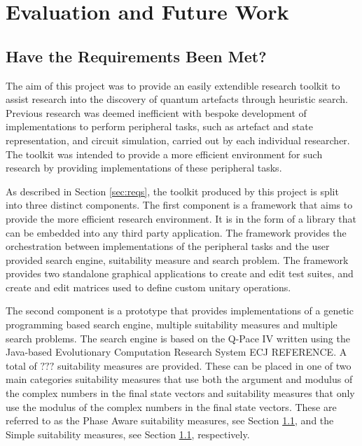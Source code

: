 \chapter{Evaluation and Future Work}

\section{Have the Requirements Been Met?}




The aim of this project was to provide an easily extendible research toolkit to assist research into the discovery of quantum artefacts through heuristic search.
Previous research was deemed inefficient with bespoke development of implementations to perform peripheral tasks, such as artefact and state representation, and circuit simulation, carried out by each individual researcher.
The toolkit was intended to provide a more efficient environment for such research by providing implementations of these peripheral tasks.

As described in Section \ref{sec:reqs}, the toolkit produced by this project is split into three distinct components.
The first component is a framework that aims to provide the more efficient research environment.
It is in the form of a library that can be embedded into any third party application.
The framework provides the orchestration between implementations of the peripheral tasks and the user provided search engine, suitability measure and search problem.
The framework provides two standalone graphical applications to create and edit test suites, and create and edit matrices used to define custom unitary operations.

The second component is a prototype that provides implementations of a genetic programming based search engine, multiple suitability measures and multiple search problems.
The search engine is based on the Q-Pace IV\cite{masseythesis} written using the Java-based Evolutionary Computation Research System ECJ REFERENCE.
A total of $???$ suitability measures are provided.
These can be placed in one of two main categories suitability measures that use both the argument and modulus of the complex numbers in the final state vectors and suitability measures that only use the modulus of the complex numbers in the final state vectors.
These are referred to as the Phase Aware suitability measures, see Section \ref{}, and the Simple suitability measures, see Section \ref{}, respectively.


